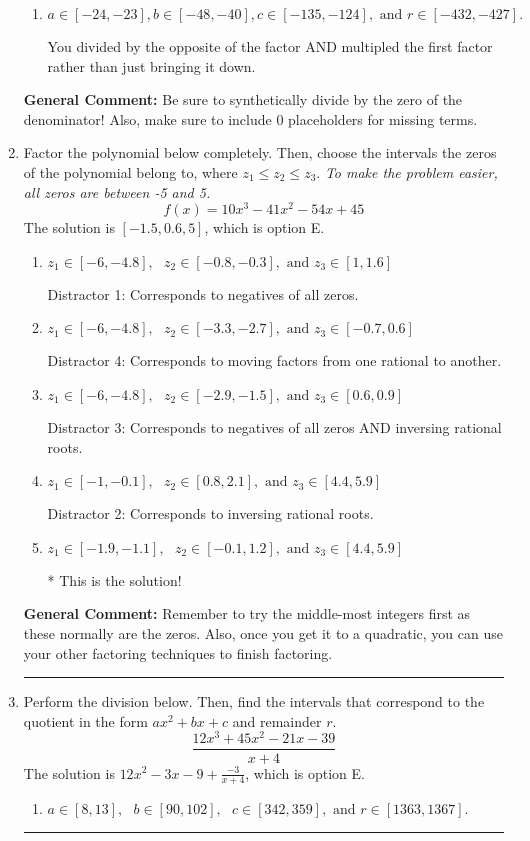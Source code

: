 \documentclass{extbook}[14pt]
\newcommand{\litem}[1]{\item #1

\rule{\textwidth}{0.4pt}}
\begin{document}
\begin{enumerate}
{\begin{enumerate}[label=\Alph*.]
 You multipled by the synthetic number rather than bringing the first factor down.
\item \( a \in [-24, -23], b \in [-48, -40], c \in [-135, -124], \text{ and } r \in [-432, -427]. \)

 You divided by the opposite of the factor AND multipled the first factor rather than just bringing it down.
\end{enumerate}

\textbf{General Comment:} Be sure to synthetically divide by the zero of the denominator! Also, make sure to include 0 placeholders for missing terms.
}
\litem{
Factor the polynomial below completely. Then, choose the intervals the zeros of the polynomial belong to, where $z_1 \leq z_2 \leq z_3$. \textit{To make the problem easier, all zeros are between -5 and 5.}
\[ f(x) = 10x^{3} -41 x^{2} -54 x + 45 \]The solution is \( [-1.5, 0.6, 5] \), which is option E.\begin{enumerate}[label=\Alph*.]
\item \( z_1 \in [-6, -4.8], \text{   }  z_2 \in [-0.8, -0.3], \text{   and   } z_3 \in [1, 1.6] \)

 Distractor 1: Corresponds to negatives of all zeros.
\item \( z_1 \in [-6, -4.8], \text{   }  z_2 \in [-3.3, -2.7], \text{   and   } z_3 \in [-0.7, 0.6] \)

 Distractor 4: Corresponds to moving factors from one rational to another.
\item \( z_1 \in [-6, -4.8], \text{   }  z_2 \in [-2.9, -1.5], \text{   and   } z_3 \in [0.6, 0.9] \)

 Distractor 3: Corresponds to negatives of all zeros AND inversing rational roots.
\item \( z_1 \in [-1, -0.1], \text{   }  z_2 \in [0.8, 2.1], \text{   and   } z_3 \in [4.4, 5.9] \)

 Distractor 2: Corresponds to inversing rational roots.
\item \( z_1 \in [-1.9, -1.1], \text{   }  z_2 \in [-0.1, 1.2], \text{   and   } z_3 \in [4.4, 5.9] \)

* This is the solution!
\end{enumerate}

\textbf{General Comment:} Remember to try the middle-most integers first as these normally are the zeros. Also, once you get it to a quadratic, you can use your other factoring techniques to finish factoring.
}
\litem{
Perform the division below. Then, find the intervals that correspond to the quotient in the form $ax^2+bx+c$ and remainder $r$.
\[ \frac{12x^{3} +45 x^{2} -21 x -39}{x + 4} \]The solution is \( 12x^{2} -3 x -9 + \frac{-3}{x + 4} \), which is option E.\begin{enumerate}[label=\Alph*.]
\item \( a \in [8, 13], \text{   } b \in [90, 102], \text{   } c \in [342, 359], \text{   and   } r \in [1363, 1367]. \)


\end{enumerate}}
\end{enumerate}
\end{document}
